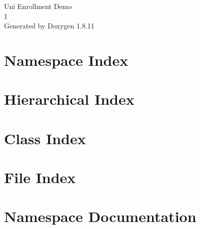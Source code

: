 \documentclass[twoside]{book}
\newcommand{\+}{\discretionary{\mbox{\scriptsize$\hookleftarrow$}}{}{}}
\newcommand{\clearemptydoublepage}{%
  \newpage{\pagestyle{empty}\cleardoublepage}%
}
\begin{document}
\hypersetup{pageanchor=false,
             bookmarksnumbered=true,
             pdfencoding=unicode
            }
\begin{titlepage}
\vspace*{7cm}
\begin{center}%
{\Large Uni Enrollment Demo \\[1ex]\large 1 }\\
\vspace*{1cm}
{\large Generated by Doxygen 1.8.11}\\
\end{center}
\end{titlepage}
\clearemptydoublepage
\tableofcontents
\clearemptydoublepage
{}
\hypersetup{pageanchor=true}

\chapter{Namespace Index}

\chapter{Hierarchical Index}

\chapter{Class Index}

\chapter{File Index}

\chapter{Namespace Documentation}




\end{document}
